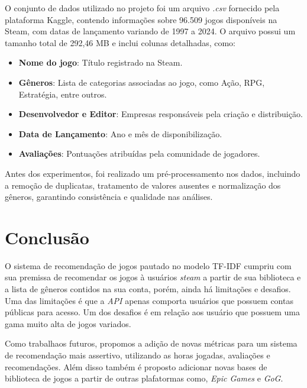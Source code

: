 \documentclass[conference]{IEEEtran}
\begin{document}
O conjunto de dados utilizado no projeto foi um arquivo \textit{.csv} fornecido pela plataforma Kaggle, contendo informações sobre 96.509 jogos disponíveis na Steam, com datas de lançamento variando de 1997 a 2024. O arquivo possui um tamanho total de 292,46 MB e inclui colunas detalhadas, como:
\begin{itemize}
    \item \textbf{Nome do jogo}: Título registrado na Steam.
    \item \textbf{Gêneros}: Lista de categorias associadas ao jogo, como Ação, RPG, Estratégia, entre outros.
    \item \textbf{Desenvolvedor e Editor}: Empresas responsáveis pela criação e distribuição.
    \item \textbf{Data de Lançamento}: Ano e mês de disponibilização.
    \item \textbf{Avaliações}: Pontuações atribuídas pela comunidade de jogadores.
\end{itemize}

Antes dos experimentos, foi realizado um pré-processamento nos dados, incluindo a remoção de duplicatas, tratamento de valores ausentes e normalização dos gêneros, garantindo consistência e qualidade nas análises.

\section{Conclusão}

O sistema de recomendação de jogos pautado no modelo TF-IDF cumpriu com sua premissa de recomendar os jogos à usuários \textit{steam} a partir de sua biblioteca e a lista de gêneros contidos na sua conta, porém, ainda há limitações e desafios. Uma das limitações é que a \textit{API} apenas comporta usuários que possuem contas públicas para acesso. Um dos desafios é em relação aos usuário que possuem uma gama muito alta de jogos variados.

Como trabalhaos futuros, propomos a adição de novas métricas para um sistema de recomendação mais assertivo, utilizando as horas jogadas, avaliações e recomendações. Além disso também é proposto adicionar novas bases de biblioteca de jogos a partir de outras plafatormas como, \textit{Epic Games} e \textit{GoG}.
\end{document}

